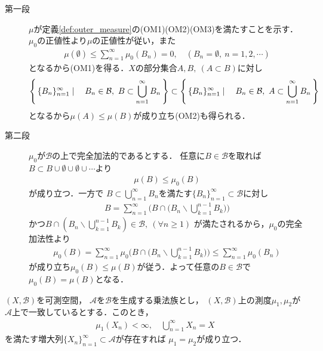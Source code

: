 		\begin{prf}\mbox{}
			\begin{description}
				\item[第一段]
					$\mu$が定義\ref{def:outer_measure}の(OM1)(OM2)(OM3)を満たすことを示す．
					$\mu_0$の正値性より$\mu$の正値性が従い，また
					\begin{align}
						\mu(\emptyset) \leq \sum_{n=1}^\infty \mu_0(B_n) = 0,
						\quad (B_n = \emptyset,\ n=1,2,\cdots)
					\end{align}
					となるから(OM1)を得る．$X$の部分集合$A,B,\ (A \subset B)$に対し
					\begin{align}
						\Set{\{B_n\}_{n=1}^\infty}{B_n \in \mathcal{B},\ B \subset \bigcup_{n=1}^\infty B_n}
						\subset \Set{\{B_n\}_{n=1}^\infty}{B_n \in \mathcal{B},\ A \subset \bigcup_{n=1}^\infty B_n}
					\end{align}
					となるから$\mu(A) \leq \mu(B)$が成り立ち(OM2)も得られる．
					
				\item[第二段]
					$\mu_0$が$\mathcal{B}$の上で完全加法的であるとする．
					任意に$B \in \mathcal{B}$を取れば
					$B \subset B \cup \emptyset \cup \emptyset \cup \cdots$より
					\begin{align}
						\mu(B) \leq \mu_0(B)
					\end{align}
					が成り立つ．一方で
					$B \subset \bigcup_{n=1}^\infty B_n$を満たす$\{B_n\}_{n=1}^\infty \subset \mathcal{B}$に対し
					\begin{align}
						B = \sum_{n=1}^\infty \Biggl( B \cap \Biggl( B_n \backslash \bigcup_{k=1}^{n-1}B_k \Biggr) \Biggr)
					\end{align}
					かつ$B \cap \left( B_n \backslash \bigcup_{k=1}^{n-1}B_k \right) \in \mathcal{B},\ (\forall n \geq 1)$
					が満たされるから，$\mu_0$の完全加法性より
					\begin{align}
						\mu_0(B) = \sum_{n=1}^\infty \mu_0\Biggl( B \cap \Biggl( B_n \backslash \bigcup_{k=1}^{n-1}B_k \Biggr) \Biggr)
						\leq \sum_{n=1}^\infty \mu_0(B_n)
					\end{align}
					が成り立ち$\mu_0(B) \leq \mu(B)$が従う．よって任意の$B \in \mathcal{B}$で$\mu_0(B) = \mu(B)$となる．
					\QED
			\end{description}
		\end{prf}
		
		
		\begin{screen}
			\begin{thm}[測度の一致の定理]\label{thm:identity_theorem_of_measures}
				$(X,\mathcal{B})$を可測空間，
				$\mathcal{A}$を$\mathcal{B}$を生成する乗法族とし，
				$(X,\mathcal{B})$上の測度$\mu_1,\mu_2$が
				$\mathcal{A}$上で一致しているとする．このとき，
				\begin{align}
					\mu_1(X_n) < \infty,
					\quad \bigcup_{n=1}^\infty X_n = X
				\end{align}
				を満たす増大列$\{X_n\}_{n=1}^\infty \subset \mathcal{A}$が存在すれば
				$\mu_1 = \mu_2$が成り立つ．
			\end{thm}
		\end{screen}
		
